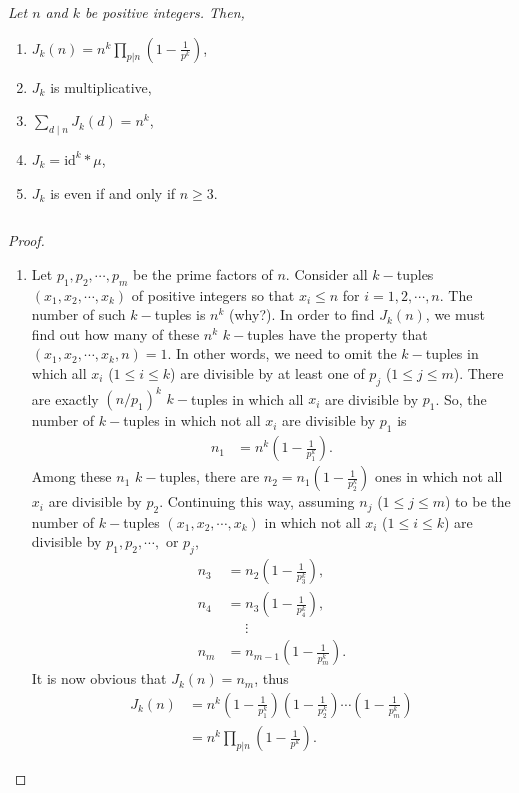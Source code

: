 \documentclass[12pt]{subfile}
\begin{document}
		\begin{theorem} \slshape
			Let $n$ and $k$ be positive integers. Then,
				\begin{enumerate}
					\item $\displaystyle J_k(n) = n^k \prod\limits_{p|n} \left(1 - \frac{1}{p^k}\right)$,
					\item $J_k$ is multiplicative,
					\item $\displaystyle \sum_{d\mid n} J_k(d) = n^k$,
					\item $J_k = \text{id}^k \ast \mu$,
					\item $J_k$ is even if and only if $n \geq 3$.
				\end{enumerate}
		\end{theorem}
$ $

		\begin{proof}
			$ $
			\begin{enumerate}
				\item Let $p_1,p_2,\cdots,p_m$ be the prime factors of $n$. Consider all $k-$tuples $(x_1,x_2,\cdots,x_k)$ of positive integers so that $x_i\leq n$ for $i=1,2,\cdots,n$. The number of such $k-$tuples is $n^k$ (why?). In order to find $J_k(n)$, we must find out how many of these $n^k$ $k-$tuples have the property that $(x_1,x_2,\cdots,x_k,n)=1$. In other words, we need to omit the $k-$tuples in which all $x_i$ ($1 \leq i \leq k$) are divisible by at least one of $p_j$ ($1 \leq j \leq m$). There are exactly $(n/p_1)^k$ $k-$tuples in which all $x_i$ are divisible by $p_1$. So, the number of $k-$tuples in which not all $x_i$ are divisible by $p_1$ is
					\begin{align*}
						n_1 &= n^k \left(1 - \frac{1}{p_1^k}\right).
					\end{align*}
				Among these $n_1$ $k-$tuples, there are $n_2 = n_1\left(1 - \frac{1}{p_2^k}\right)$ ones in which not all $x_i$ are divisible by $p_2$. Continuing this way, assuming $n_j$ ($1 \leq j \leq m$) to be the number of $k-$tuples $(x_1,x_2,\cdots,x_k)$ in which not all $x_i$ ($1 \leq i \leq k$) are divisible by $p_1, p_2, \cdots, $ or $p_j$,
					\begin{align*}
						n_3 &= n_2 \left(1 - \frac{1}{p_3^k}\right),\\
						n_4 &= n_3 \left(1 - \frac{1}{p_4^k}\right),\\
						&\phantom{=}\vdots\\
						n_m &= n_{m-1} \left(1 - \frac{1}{p_m^k}\right).
					\end{align*}
				It is now obvious that $J_k(n)=n_m$, thus
					\begin{align*}
						J_k(n) &= n^k \left(1 - \frac{1}{p_1^k}\right) \left(1 - \frac{1}{p_2^k}\right)\cdots \left(1 - \frac{1}{p_m^k}\right)\\
							   &= n^k \prod\limits_{p|n} \left(1 - \frac{1}{p^k}\right).
					\end{align*}


\end{enumerate}
\end{proof}
\end{document}
